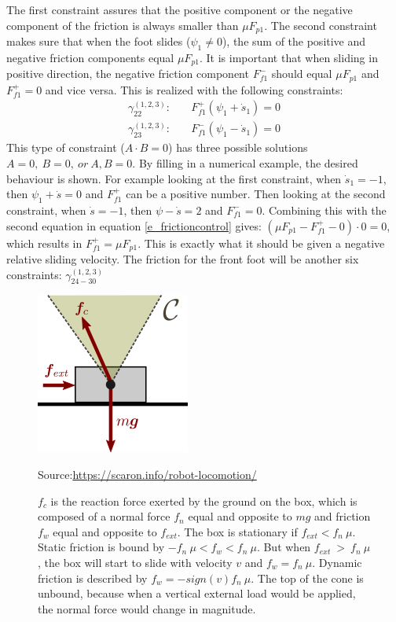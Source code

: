 The first constraint assures that the positive component or the negative component of the friction is always smaller than $\mu F_{p1}$. The second constraint makes sure that when the foot slides ($\psi_1 \not = 0$),  the sum of the positive and negative friction components equal $\mu F_{p1}$. It is important that when sliding in positive direction, the negative friction component $F_{f1}^-$ should equal $\mu F_{p1}$ and $F_{f1}^+=0$ and vice versa. This is realized with the following constraints:
\begin{equation}
\begin{split}
    \gamma_{22}^{(1,2,3)}: \quad & F_{f1}^+ (\psi_1 + \dot s_1)  = 0 \\
    \gamma_{23}^{(1,2,3)}: \quad & F_{f1}^- (\psi_1 - \dot s_1)  = 0
\end{split}
\end{equation}
This type of constraint ($A\cdot B = 0$) has three possible solutions $A= 0,\ B=0,\ or\ A,B = 0$. By filling in a numerical example, the desired behaviour is shown. For example looking at the first constraint, when $\dot s_1 = -1$, then $\psi_1 + \dot s =  0$ and $F_{f1}^+$ can be a positive number. Then looking at the second constraint, when $\dot s = -1$, then $\psi - \dot s = 2$ and $F_{f1}^- = 0$. Combining this with the second equation in equation \ref{e_frictioncontrol} gives: $(\mu F_{p1} - F_{f1}^+ - 0) \cdot 0 = 0$, which results in $F_{f1}^+ = \mu F_{p1}$. This is exactly what it should be given a negative relative sliding velocity. 
The friction for the front foot will be another six constraints: $\gamma_{24-30}^{(1,2,3)}$ 
\begin{figure}
    \centering
    \includegraphics{figure/Frictioncone.png}
    \caption[friction cone]{$f_c$ is the reaction force exerted by the ground on the box, which is composed of a normal force $f_n$ equal and opposite to $mg$ and friction $f_w$ equal and opposite to $f_{ext}$. The box is stationary if $f_{ext} < f_n\ \mu$. Static friction is bound by $-f_n\ \mu < f_w < f_n\ \mu$. But when $f_{ext}\ >\ f_n\ \mu$, the box will start to slide with velocity $v$ and $f_w = f_n\ \mu$. Dynamic friction is described by $f_w = -sign(v) f_n\ \mu$. The top of the cone is unbound, because when a vertical external load would be applied, the normal force would change in magnitude.} 
    \footnotesize Source:\url{https://scaron.info/robot-locomotion/}
    \label{f_frictioncone}
\end{figure}

